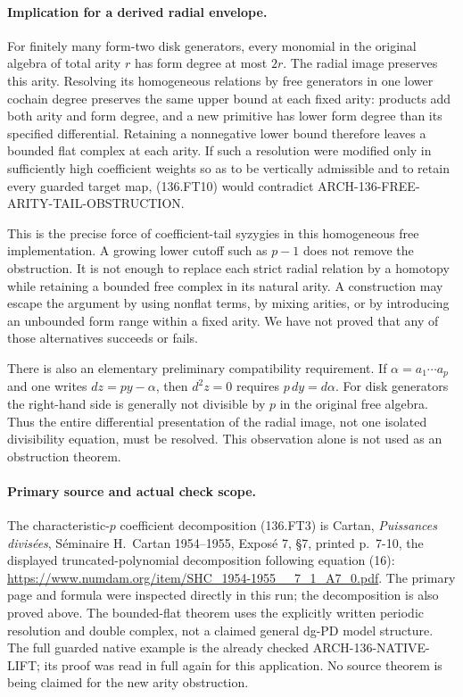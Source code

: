 \paragraph{Implication for a derived radial envelope.}
For finitely many form-two disk generators, every monomial in the
original algebra of total arity \(r\) has form degree at most
\(2r\). The radial image preserves this arity. Resolving its
homogeneous relations by free generators in one lower cochain
degree preserves the same upper bound at each fixed arity:
products add both arity and form degree, and a new primitive has
lower form degree than its specified differential. Retaining a
nonnegative lower bound therefore leaves a bounded flat complex
at each arity. If such a resolution were modified only in sufficiently
high coefficient weights so as to be vertically admissible and to
retain every guarded target map, (136.FT10) would contradict
ARCH-136-FREE-ARITY-TAIL-OBSTRUCTION.

This is the precise force of coefficient-tail syzygies in this
homogeneous free implementation. A growing lower cutoff such as
\(p-1\) does not remove the obstruction. It is not enough to replace
each strict radial relation by a homotopy while retaining a bounded
free complex in its natural arity. A construction may escape the
argument by using nonflat terms, by mixing arities, or by introducing
an unbounded form range within a fixed arity. We have not proved
that any of those alternatives succeeds or fails.

There is also an elementary preliminary compatibility requirement.
If \(\alpha=a_1\cdots a_p\) and one writes
\(dz=py-\alpha\), then \(d^2z=0\) requires
\(p\,dy=d\alpha\). For disk generators the right-hand side is
generally not divisible by \(p\) in the original free algebra.
Thus the entire differential presentation of the radial image,
not one isolated divisibility equation, must be resolved. This
observation alone is not used as an obstruction theorem.

\paragraph{Primary source and actual check scope.}
The characteristic-\(p\) coefficient decomposition (136.FT3) is
Cartan, \emph{Puissances divis\'ees}, S\'eminaire H.~Cartan
1954--1955, Expos\'e 7, \S7, printed p.~7-10, the displayed
truncated-polynomial decomposition following equation (16):
\url{https://www.numdam.org/item/SHC_1954-1955__7_1_A7_0.pdf}.
The primary page and formula were inspected directly in this run;
the decomposition is also proved above. The bounded-flat theorem
uses the explicitly written periodic resolution and double complex,
not a claimed general dg-PD model structure. The full guarded native
example is the already checked ARCH-136-NATIVE-LIFT; its proof was
read in full again for this application. No source theorem is being
claimed for the new arity obstruction.
